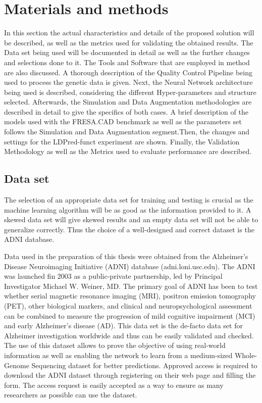 \chapter{Materials and methods} \label{materials_and_methods}
In this section the actual characteristics and details of the proposed solution will be described, as well as the metrics used for validating the obtained results. The Data set being used will be documented in detail as well as the further changes and selections done to it. The Tools and Software that are employed in method are also discussed. A thorough description of the Quality Control Pipeline being used to process the genetic data is given. Next, the Neural Network architecture being used is described, considering the different Hyper-parameters and structure selected. Afterwards, the Simulation and Data Augmentation methodologies are described in detail to give the specifics of both cases. A brief description of the models used with the FRESA.CAD benchmark as well as the parameters set follows the Simulation and Data Augmentation segment.Then, the changes and settings for the LDPred-funct experiment are shown. Finally, the Validation Methodology as well as the Metrics used to evaluate performance are described.

\section{Data set}
 
The selection of an appropriate data set for training and testing is crucial as the machine learning algorithm will be as good as the information provided to it. A skewed data set will give skewed results and an empty data set will not be able to generalize correctly. Thus the choice of a well-designed and correct dataset is the ADNI database. 

Data used in the preparation of this thesis were obtained from the Alzheimer’s Disease Neuroimaging Initiative (ADNI) database (adni.loni.usc.edu). The ADNI was launched fin 2003 as a public-private partnership, led by Principal Investigator Michael W. Weiner, MD. The primary goal of ADNI has been to test whether serial magnetic resonance imaging (MRI), positron emission tomography (PET), other biological markers, and clinical and neuropsychological assessment can be combined to measure the progression of mild cognitive impairment (MCI) and early Alzheimer’s disease (AD). This data set is the de-facto data set for Alzheimer investigation worldwide and thus can be easily validated and checked. The use of this dataset allows to prove the objective of using real-world information as well as enabling the network to learn from a medium-sized Whole-Genome Sequencing dataset for better predictions. Approved access is required to download the ADNI dataset through registering on their web page and filling the form. The access request is easily accepted as a way to ensure as many researchers as possible can use the dataset.

